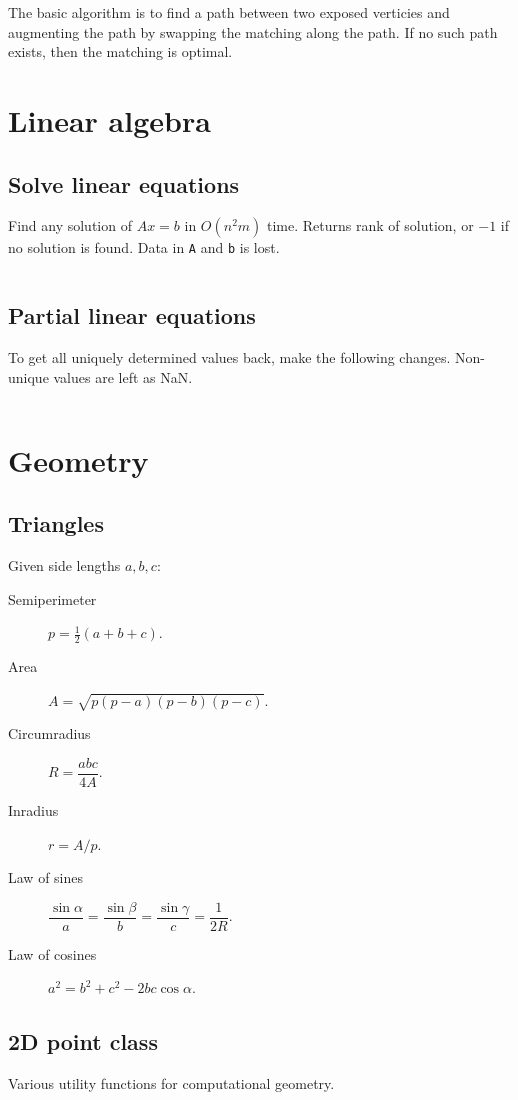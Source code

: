 \documentclass[10pt,a4paper,landscape,oneside]{amsart}
\newcommand{\code}[1]{\inputminted[fontsize=\large,tabsize=2,baselinestretch=1]{java}{#1}}
\begin{document}
\begin{multicols*}{2}
The basic algorithm is to find a path between two exposed verticies and augmenting the
path by swapping the matching along the path. If no such path exists, then the matching
is optimal.

\section{Linear algebra}
\subsection{Solve linear equations}
Find any solution of \(Ax = b\) in \(O(n^2m)\) time. Returns rank of solution, or \(-1\)
if no solution is found. Data in \texttt{A} and \texttt{b} is lost.
\code{linear-algebra/linear-system.java}
\subsection{Partial linear equations}
To get all uniquely determined values back, make the following changes. Non-unique values
are left as NaN.
\code{linear-algebra/partial-linear-system.java}

\section{Geometry}
\subsection{Triangles}
Given side lengths \(a, b, c\):
\begin{description}
  \item[Semiperimeter] \(p = \tfrac{1}{2} (a+b+c)\).
  \item[Area] \(A = \sqrt{p (p-a)(p-b)(p-c)}\).
  \item[Circumradius] \(R = \dfrac{abc}{4A}\).
  \item[Inradius] \(r = A / p\).
  \item[Law of sines]
    \(\dfrac{\sin \alpha}a = \dfrac{\sin \beta}b = \dfrac{\sin \gamma}c = \dfrac1{2R}\).
  \item[Law of cosines] \(a^2 = b^2 + c^2 - 2bc \cos\alpha\).
\end{description}

\subsection{2D point class}
Various utility functions for computational geometry.
\code{geometry/geometry.java}


\end{multicols*}
\end{document}
